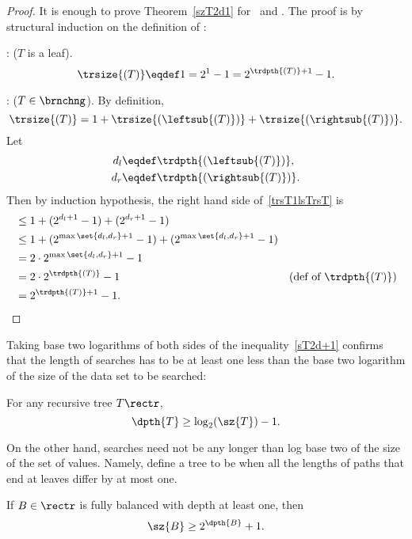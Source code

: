 \begin{definition}
\begin{proof} 
It is enough to prove Theorem~\ref{szT2d1} for \trsize\ and \trdpth.
The proof is by structural induction on the definition of \rectr:

: ($T$ is a leaf).
\[
\trsize{(T)} \eqdef 1 = 2^1 - 1 = 2^{\trdpth{(T)}+1} - 1.
\]

: ($T \in \brnchng$).
By definition,
\begin{equation}\label{trsT1lsTrsT}
\trsize{(T)} = 1 + \trsize{(\leftsub{(T)})} + \trsize{(\rightsub{(T)})}.
\end{equation}
Let
\begin{align*}
d_l & \eqdef \trdpth{(\leftsub{(T)})},\\
d_r & \eqdef \trdpth{(\rightsub{(T)})}.
\end{align*}
Then by induction hypothesis, the right hand side of~\eqref{trsT1lsTrsT} is
\begin{align*}
& \leq 1 + (2^{d_l+1} -1)  + (2^{d_r+1} -1)\\
& \leq 1 + (2^{\max\set{d_l,d_r}+1} -1)  + (2^{\max\set{d_l,d_r}+1} -1)\\
& = 2\cdot 2^{\max\set{d_l,d_r}+1} - 1\\
& = 2\cdot 2^{\trdpth{(T)}} - 1
              & \text{(def of $\trdpth{(T)}$)}\\
& =  2^{\trdpth{(T)}+1} - 1.
\end{align*}
\end{proof}

Taking base two logarithms of both sides of the
inequality~\eqref{sT2d+1} confirms that the length of searches has to
be at least one less than the base two logarithm of the size of the
data set to be searched:

\begin{corollary}
For any recursive tree $T \rectr$,
\begin{equation}\label{}
\dpth{T} \geq \log_2(\sz{T}) - 1.
\end{equation}
\end{corollary}

On the other hand, searches need not be any longer than log base two
of the size of the set of values.  Namely, define a tree to be  when all the lengths of paths that end at leaves differ by
at most one.

\begin{theorem}\label{b>2d}
If $B \in \rectr$ is fully balanced with depth at least one, then
\[
\sz{B} \geq 2^{\dpth{B}} + 1.
\]


\end{theorem}
\end{definition}
